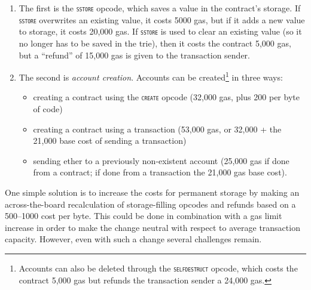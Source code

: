 \documentclass[12pt, final]{article}
\newcommand{\opcode}[1]{\textsc{\texttt{#1}}}
\begin{document}
\begin{enumerate}
    \item The first is the \opcode{sstore} opcode, which saves a value in the contract's storage. If \opcode{sstore} overwrites an existing value, it costs 5000 gas, but if it adds a new value to storage, it costs 20,000 gas. If \opcode{sstore} is used to clear an existing value (so it no longer has to be saved in the trie), then it costs the contract 5,000 gas, but a ``refund'' of 15,000 gas is given to the transaction sender.

    \item The second is \emph{account creation}. Accounts can be created\footnote{Accounts can also be deleted through the \opcode{selfdestruct} opcode, which costs the contract 5,000 gas but refunds the transaction sender a 24,000 gas.} in three ways:

    \begin{itemize}
        \item creating a contract using the \opcode{create} opcode (32,000 gas, plus 200 per byte of code)
        \item creating a contract using a transaction (53,000 gas, or 32,000 + the 21,000 base cost of sending a transaction)
        \item sending ether to a previously non-existent account (25,000 gas if done from a contract; if done from a transaction the 21,000 gas base cost).

    \end{itemize}

\end{enumerate}


One simple solution is to increase the costs for permanent storage by making an across-the-board recalculation of storage-filling opcodes and refunds based on a 500--1000 cost per byte. This could be done in combination with a gas limit increase in order to make the change neutral with respect to average transaction capacity. However, even with such a change several challenges remain.
\end{document}
